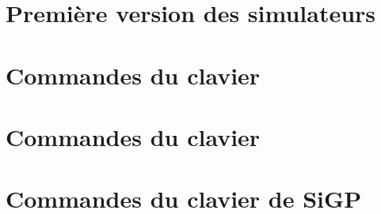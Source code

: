 %
%
\begin{appendix}
\chapter{Première version des simulateurs}


\newpage
\chapter{Commandes du clavier}


\newpage
\chapter{Commandes du clavier}


\newpage
\chapter{Commandes du clavier de SiGP}


%
\end{appendix}
%
%
